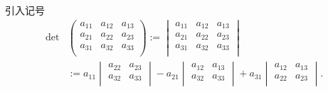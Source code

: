 \begin{frame}\frametitle{}
 引入记号
\begin{equation*}
\begin{aligned}
\det&\begin{pmatrix}a_{11}&a_{12}&a_{13}\\a_{21}&a_{22}&a_{23}\\a_{31}&a_{32}&a_{33}\\\end{pmatrix}
   := \begin{vmatrix}a_{11}&a_{12}&a_{13}\\a_{21}&a_{22}&a_{23}\\a_{31}&a_{32}&a_{33}\\\end{vmatrix}\\
 & := a_{11}\begin{vmatrix}a_{22}&a_{23}\\a_{32}&a_{33}\\\end{vmatrix}
     -a_{21}\begin{vmatrix}a_{12}&a_{13}\\a_{32}&a_{33}\\\end{vmatrix}
     +a_{31}\begin{vmatrix}a_{12}&a_{13}\\a_{22}&a_{23}\\\end{vmatrix}.\\
\end{aligned}
\end{equation*}
\pp
\bigskip


\end{frame}
